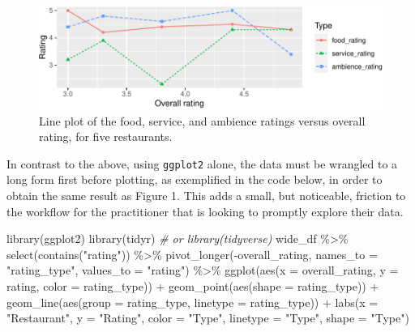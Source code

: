 \documentclass[10pt,a4paper,onecolumn]{article}
\newenvironment{Shaded}{\begin{snugshade}}{\end{snugshade}}
\newcommand{\AttributeTok}[1]{\textcolor[rgb]{0.77,0.63,0.00}{#1}}
\newcommand{\CommentTok}[1]{\textcolor[rgb]{0.56,0.35,0.01}{\textit{#1}}}
\newcommand{\FunctionTok}[1]{\textcolor[rgb]{0.00,0.00,0.00}{#1}}
\newcommand{\NormalTok}[1]{#1}
\newcommand{\SpecialCharTok}[1]{\textcolor[rgb]{0.00,0.00,0.00}{#1}}
\newcommand{\StringTok}[1]{\textcolor[rgb]{0.31,0.60,0.02}{#1}}
\begin{document}
\begin{figure}
\centering
\includegraphics{paper_files/figure-latex/matplot2-1.pdf}
\caption{Line plot of the food, service, and ambience ratings versus
overall rating, for five restaurants.}
\end{figure}

In contrast to the above, using \texttt{ggplot2} alone, the data must be
wrangled to a long form first before plotting, as exemplified in the
code below, in order to obtain the same result as Figure 1. This adds a
small, but noticeable, friction to the workflow for the practitioner
that is looking to promptly explore their data.

\begin{Shaded}
\begin{Highlighting}[]
\FunctionTok{library}\NormalTok{(ggplot2)}
\FunctionTok{library}\NormalTok{(tidyr) }\CommentTok{\# or library(tidyverse)}
\NormalTok{wide\_df }\SpecialCharTok{\%\textgreater{}\%} 
  \FunctionTok{select}\NormalTok{(}\FunctionTok{contains}\NormalTok{(}\StringTok{"rating"}\NormalTok{)) }\SpecialCharTok{\%\textgreater{}\%} 
  \FunctionTok{pivot\_longer}\NormalTok{(}\SpecialCharTok{{-}}\NormalTok{overall\_rating, }
               \AttributeTok{names\_to =} \StringTok{"rating\_type"}\NormalTok{,}
               \AttributeTok{values\_to =} \StringTok{"rating"}\NormalTok{) }\SpecialCharTok{\%\textgreater{}\%} 
  \FunctionTok{ggplot}\NormalTok{(}\FunctionTok{aes}\NormalTok{(}\AttributeTok{x =}\NormalTok{ overall\_rating, }\AttributeTok{y =}\NormalTok{ rating, }\AttributeTok{color =}\NormalTok{ rating\_type)) }\SpecialCharTok{+} 
  \FunctionTok{geom\_point}\NormalTok{(}\FunctionTok{aes}\NormalTok{(}\AttributeTok{shape =}\NormalTok{ rating\_type)) }\SpecialCharTok{+}
  \FunctionTok{geom\_line}\NormalTok{(}\FunctionTok{aes}\NormalTok{(}\AttributeTok{group =}\NormalTok{ rating\_type, }\AttributeTok{linetype =}\NormalTok{ rating\_type)) }\SpecialCharTok{+}
  \FunctionTok{labs}\NormalTok{(}\AttributeTok{x =} \StringTok{"Restaurant"}\NormalTok{, }\AttributeTok{y =} \StringTok{"Rating"}\NormalTok{, }
       \AttributeTok{color =} \StringTok{"Type"}\NormalTok{, }\AttributeTok{linetype =} \StringTok{"Type"}\NormalTok{, }\AttributeTok{shape =} \StringTok{"Type"}\NormalTok{)}
\end{Highlighting}
\end{Shaded}
\end{document}
